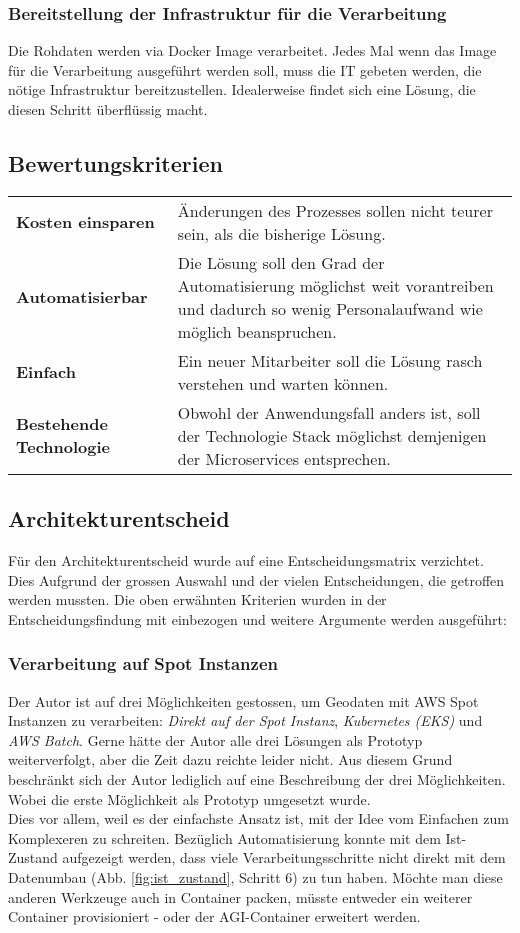 \subsubsection{Bereitstellung der Infrastruktur für die Verarbeitung}
Die Rohdaten werden via Docker Image verarbeitet. Jedes Mal wenn das Image für die Verarbeitung ausgeführt werden soll, muss die IT gebeten werden, die nötige Infrastruktur bereitzustellen. Idealerweise findet sich eine Lösung, die diesen Schritt überflüssig macht.


\subsection{Bewertungskriterien}
\begin{tabular}{p{}p{}}
    \textbf{Kosten einsparen} & Änderungen des Prozesses sollen nicht teurer sein, als die bisherige Lösung.\\
    \textbf{Automatisierbar} & Die Lösung soll den Grad der Automatisierung möglichst weit vorantreiben und dadurch so wenig Personalaufwand wie möglich beanspruchen.\\
    \textbf{Einfach} & Ein neuer Mitarbeiter soll die Lösung rasch verstehen und warten können.\\
    \textbf{Bestehende Technologie} & Obwohl der Anwendungsfall anders ist, soll der Technologie Stack möglichst demjenigen der Microservices entsprechen.\\
\end{tabular}

\subsection{Architekturentscheid}
Für den Architekturentscheid wurde auf eine Entscheidungsmatrix verzichtet. Dies Aufgrund der grossen Auswahl und der vielen Entscheidungen, die getroffen werden mussten. Die oben erwähnten Kriterien wurden in der Entscheidungsfindung mit einbezogen und weitere Argumente werden ausgeführt:

\subsubsection{Verarbeitung auf Spot Instanzen}
Der Autor ist auf drei Möglichkeiten gestossen, um Geodaten mit AWS Spot Instanzen zu verarbeiten: \emph{Direkt auf der Spot Instanz}, \emph{Kubernetes (EKS)} und \emph{AWS Batch}. Gerne hätte der Autor alle drei Lösungen als Prototyp weiterverfolgt, aber die Zeit dazu reichte leider nicht. Aus diesem Grund beschränkt sich der Autor lediglich auf eine Beschreibung der drei Möglichkeiten. Wobei die erste Möglichkeit als Prototyp umgesetzt wurde.\\
Dies vor allem, weil es der einfachste Ansatz ist, mit der Idee vom Einfachen zum Komplexeren zu schreiten.
Bezüglich Automatisierung konnte mit dem Ist-Zustand aufgezeigt werden, dass viele Verarbeitungsschritte nicht direkt mit dem Datenumbau (Abb. \ref{fig:ist_zustand}, Schritt 6) zu tun haben. Möchte man diese anderen Werkzeuge auch in Container packen, müsste entweder ein weiterer Container provisioniert - oder der AGI-Container erweitert werden.

